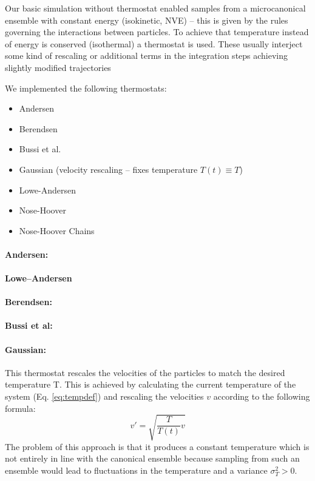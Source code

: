 

Our basic simulation without thermostat enabled samples from a microcanonical ensemble with constant energy (isokinetic, NVE) -- this is given by the rules governing the interactions between particles.
To achieve that temperature instead of energy is conserved (isothermal) a thermostat is used. These usually interject some kind of rescaling or additional terms in the integration steps achieving slightly modified trajectories

We implemented the following thermostats: %
\begin{itemize}
\item Andersen
\item Berendsen
\item Bussi et al.
\item Gaussian (velocity rescaling -- fixes temperature $T(t) \equiv T$)
\item Lowe-Andersen
\item Nose-Hoover
\item Nose-Hoover Chains
\end{itemize}

\paragraph{Andersen:}
\paragraph{Lowe--Andersen}
\paragraph{Berendsen:}
\paragraph{Bussi et al:}
\paragraph{Gaussian:} This thermostat rescales the velocities of the particles to match the desired temperature T. This is achieved by calculating the current temperature of the system (Eq. \eqref{eq:tempdef}) and rescaling the velocities $v$ according to the following formula:
\begin{equation*}
v'  = \sqrt{\frac{T}{T(t)}v}
\end{equation*}
The problem of this approach is that it produces a constant temperature which is not entirely in line with the canonical ensemble because sampling from such an ensemble would lead to fluctuations in the temperature and a variance $\sigma_T^2 > 0$.

